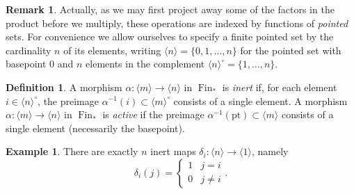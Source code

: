 \documentclass[12pt]{article}
\theoremstyle{definition}
\newtheorem{definition}{Definition}[subsection]
\newtheorem{example}{Example}[subsection]
\newtheorem{remark}{Remark}[subsection]
\DeclareMathOperator{\Fin}{Fin}
\newcommand{\pt}{\mathrm{pt}}
\begin{document}
\begin{remark}
Actually, as we may first project away some of the factors in the product before we multiply, these operations are indexed by functions of  {\em pointed} sets.
For convenience we allow ourselves to specify a finite pointed set by the cardinality $n$ of its elements, writing $\langle n\rangle=\{0,1,\ldots,n\}$ for the pointed set with basepoint $0$ and $n$ elements in the complement $\langle n\rangle^\circ=\{1,\ldots,n\}$.
\end{remark}
\begin{definition}
A morphism $\alpha:\langle m\rangle\to \langle n\rangle$ in $\Fin_*$ is {\em inert}
\index{inert map!in $\Fin_*$}
if, for each element $i\in\langle n\rangle^\circ$, the preimage $\alpha^{-1}(i)\subset\langle m\rangle^\circ$ consists of a single element.
A morphism $\alpha:\langle m\rangle\to \langle n\rangle$ in $\Fin_*$ is {\em active}
if the preimage $\alpha^{-1}(\pt)\subset\langle m\rangle$ consists of a single element (necessarily the basepoint).
\end{definition}

\begin{example}
There are exactly $n$ inert maps $\delta_i:\langle n\rangle\to\langle 1\rangle$, namely
\[
\delta_i(j)=\begin{cases} 
      1 & j=i \\
      0 & j\neq i
   \end{cases}.
\]
\end{example}
\end{document}
